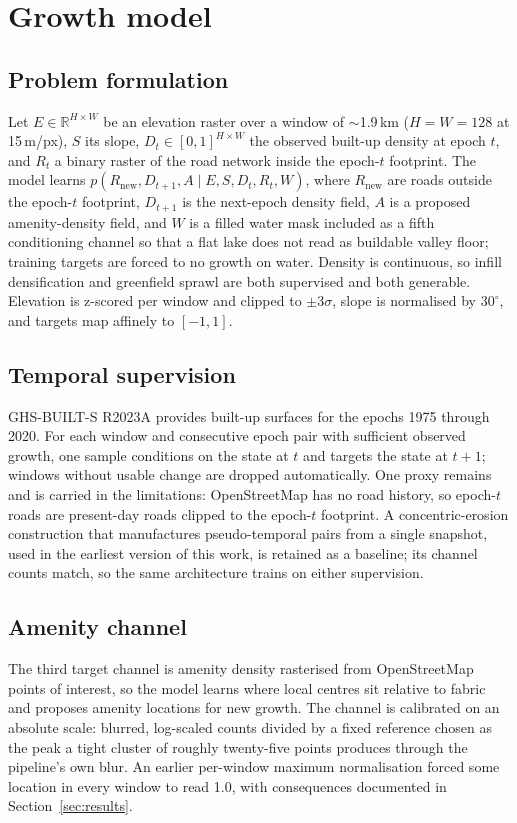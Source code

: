 \documentclass[11pt]{article}
\begin{document}
\section{Growth model}

\subsection{Problem formulation}
Let $E \in \mathbb{R}^{H \times W}$ be an elevation raster over a
window of $\sim$1.9\,km ($H{=}W{=}128$ at 15\,m/px), $S$ its slope,
$D_t \in [0,1]^{H \times W}$ the observed built-up density at epoch
$t$, and $R_t$ a binary raster of the road network inside the
epoch-$t$ footprint. The model learns
$p(R_{\mathrm{new}}, D_{t+1}, A \mid E, S, D_t, R_t, W)$, where
$R_{\mathrm{new}}$ are roads outside the epoch-$t$ footprint,
$D_{t+1}$ is the next-epoch density field, $A$ is a proposed
amenity-density field, and $W$ is a filled water mask included as a
fifth conditioning channel so that a flat lake does not read as
buildable valley floor; training targets are forced to no growth on
water. Density is continuous, so infill densification and greenfield
sprawl are both supervised and both generable. Elevation is z-scored
per window and clipped to $\pm 3\sigma$, slope is normalised by
$30^\circ$, and targets map affinely to $[-1,1]$.

\subsection{Temporal supervision}
GHS-BUILT-S R2023A \citep{pesaresi2023ghsl} provides built-up surfaces
for the epochs 1975 through 2020. For each window and consecutive
epoch pair with sufficient observed growth, one sample conditions on
the state at $t$ and targets the state at $t{+}1$; windows without
usable change are dropped automatically. One proxy remains and is
carried in the limitations: OpenStreetMap has no road history, so
epoch-$t$ roads are present-day roads clipped to the epoch-$t$
footprint. A concentric-erosion construction that manufactures
pseudo-temporal pairs from a single snapshot, used in the earliest
version of this work, is retained as a baseline; its channel counts
match, so the same architecture trains on either supervision.

\subsection{Amenity channel}
The third target channel is amenity density rasterised from
OpenStreetMap points of interest, so the model learns where local
centres sit relative to fabric and proposes amenity locations for new
growth. The channel is calibrated on an absolute scale: blurred,
log-scaled counts divided by a fixed reference chosen as the peak a
tight cluster of roughly twenty-five points produces through the
pipeline's own blur. An earlier per-window maximum normalisation
forced some location in every window to read 1.0, with consequences
documented in Section~\ref{sec:results}.
\end{document}
